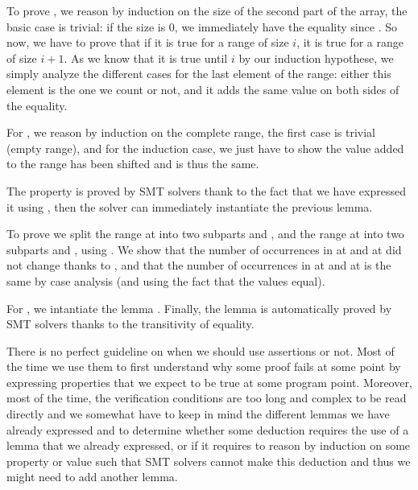 To prove , we reason by induction on the size
of the second part of the array, the basic case is trivial: if the size is 0, we
immediately have the equality since . So now, we have
to prove that if it is true for a range of size $i$, it is true for a range of
size $i+1$. As we know that it is true until $i$ by our induction hypothese, we
simply analyze the different cases for the last element of the range: either this
element is the one we count or not, and it adds the same value on both sides of
the equality.


For , we reason by induction on the complete
range, the first case is trivial (empty range), and for the induction case, we
just have to show the value added to the range has been shifted and is thus the
same.


The property  is proved by SMT solvers
thank to the fact that we have expressed it using , then the
solver can immediately instantiate the previous lemma.


To prove  we split the range at
 into two subparts  and
, and the range at  into two subparts
 and , using
. We show that the number of occurrences in
 at  and  at
 did not change thanks to ,
and that the number of occurrences in  at
 and  at  is the same by
case analysis (and using the fact that the values equal).


For , we intantiate the lemma
. Finally, the lemma
 is automatically proved by SMT solvers
thanks to the transitivity of equality.




There is no perfect guideline on when we should use assertions or not. Most of
the time we use them to first understand why some proof fails at some point by
expressing properties that we expect to be true at some program point. Moreover,
most of the time, the verification conditions are too long and complex to be read
directly and we somewhat have to keep in mind the different lemmas we have
already expressed and to determine whether some deduction requires the use of
a lemma that we already expressed, or if it requires to reason by induction on
some property or value such that SMT solvers cannot make this deduction and thus
we might need to add another lemma.



